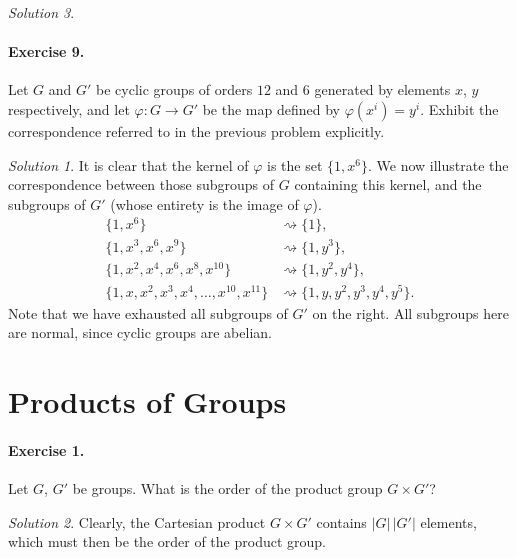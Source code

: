 \documentclass[11pt]{report}
\theoremstyle{remark}
\newtheorem*{solution}{Solution}
\begin{document}
\begin{solution}
    \paragraph{Exercise 9.} Let $G$ and $G'$ be cyclic groups of orders $12$ and $6$
    generated by elements $x$, $y$ respectively, and let $\varphi\colon G \to G'$ be
    the map defined by $\varphi(x^i) = y^i$. Exhibit the correspondence referred to
    in the previous problem explicitly.
    \begin{solution}
        It is clear that the kernel of $\varphi$ is the set $\{1, x^6\}$. We now
        illustrate the correspondence between those subgroups of $G$ containing this
        kernel, and the subgroups of $G'$ (whose entirety is the image of $\varphi$).
        \[
        \begin{array}{rl}
             \{1, x^6\} &\rightsquigarrow \{1\}, \\
             \{1, x^3, x^6, x^9\} &\rightsquigarrow \{1, y^3\}, \\
             \{1, x^2, x^4, x^6, x^8, x^{10}\} &\rightsquigarrow \{1, y^2, y^4\}, \\
             \{1, x, x^2, x^3, x^4, \dots, x^{10}, x^{11}\} &\rightsquigarrow \{1, y,
             y^2, y^3, y^4, y^5\}.
        \end{array}
        \] Note that we have exhausted all subgroups of $G'$ on the right. All
        subgroups here are normal, since cyclic groups are abelian.
    \end{solution}
    


    \section{Products of Groups}

    \paragraph{Exercise 1.} Let $G$, $G'$ be groups. What is the order of the
    product group $G \times G'$?
    \begin{solution}
        Clearly, the Cartesian product $G\times G'$ contains $|G|\,|G'|$ elements,
        which must then be the order of the product group.
    \end{solution}
    

\end{solution}
\end{document}

